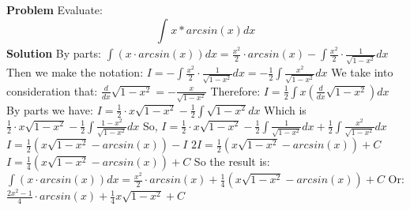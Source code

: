 \documentclass{article}
\begin{document}
{\begin{spacing}{\baselinestretch}
\newpage
\textbf{Problem}
\newline \newline
Evaluate: $$\int_ {}{}x*arcsin(x)dx$$
\newline \newline
\textbf{Solution}
\newline \newline
By parts:
$\int(x\cdot arcsin(x))dx=\frac{x^2}{2} \cdot arcsin(x)-\int \frac{x^2}{2} \cdot \frac{1}{\sqrt{1-x^2}}dx$
Then we make the notation:
$I=-\int \frac{x^2}{2} \cdot \frac{1}{\sqrt{1-x^2}}dx=-\frac{1}{2}\int\frac{x^2}{\sqrt{1-x^2}}dx$
We take into consideration that: $ \frac{d}{dx}\sqrt{1-x^2} = -\frac{x}{\sqrt{1-x^2}}$ 
Therefore: $I=\frac{1}{2}\int x (\frac {d}{dx}\sqrt{1-x^2})dx$
By parts we have: $I=\frac{1}{2} \cdot x\sqrt{1-x^2}-\frac{1}{2}\int\sqrt{1-x^2}dx$
Which is $\frac{1}{2} \cdot x\sqrt{1-x^2}-\frac{1}{2}\int\frac{1-x^2}{\sqrt{1-x^2}}dx$
So, $I=\frac{1}{2} \cdot x\sqrt{1-x^2} -\frac{1}{2} \int  \frac{1}{\sqrt{1-x^2}}dx+\frac {1}{2}\int \frac{x^2}{\sqrt{1-x^2}}dx$
$I=\frac{1}{2} ( x\sqrt{1-x^2}-arcsin(x))-I$
$2I=\frac{1}{2} ( x\sqrt{1-x^2} -arcsin(x))+C$
$I=\frac{1}{4}( x\sqrt{1-x^2} -arcsin(x))+C$
So the result is:
$\int(x\cdot arcsin(x))dx=\frac{x^2}{2} \cdot arcsin(x)+\frac{1}{4}( x\sqrt{1-x^2} -arcsin(x))+C$
Or: $\frac{2x^2-1}{4} \cdot arcsin(x)+\frac{1}{4}x\sqrt{1-x^2}+C$
\end{spacing}
}
\end{document}
